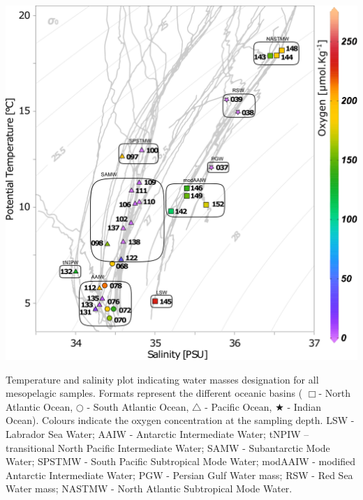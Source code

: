 \documentclass[fleqn,10pt]{wlscirep}
\begin{document}
\clearpage
\begin{suppfigure}[ht]
    \centering
    \includegraphics[scale=0.2]{images/T_Splot.pdf}
    \caption{Temperature and salinity plot indicating water masses designation for all mesopelagic samples. Formats represent the different oceanic basins ( $\Box$- North Atlantic Ocean, $\bigcirc$  - South Atlantic Ocean, $\bigtriangleup$ - Pacific Ocean, $\bigstar$ - Indian Ocean). Colours indicate the oxygen concentration at the sampling depth. LSW - Labrador Sea Water; AAIW - Antarctic Intermediate Water; tNPIW – transitional North Pacific Intermediate Water; SAMW - Subantarctic Mode Water; SPSTMW - South Pacific Subtropical Mode Water; modAAIW - modified Antarctic Intermediate Water; PGW - Persian Gulf Water mass; RSW - Red Sea Water mass; NASTMW - North Atlantic Subtropical Mode Water.}
    \label{fig:T_Splot}
\end{suppfigure}
\clearpage
\end{document}

